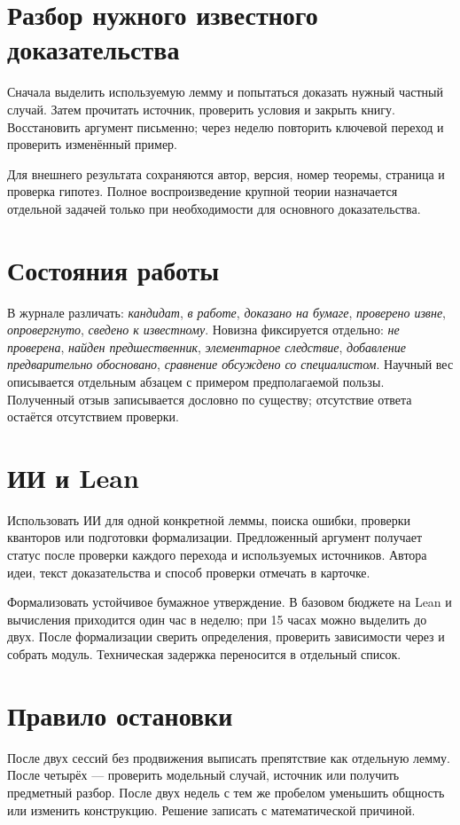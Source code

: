 \section{Разбор нужного известного доказательства}
Сначала выделить используемую лемму и попытаться доказать нужный частный
случай. Затем прочитать источник, проверить условия и закрыть книгу.
Восстановить аргумент письменно; через неделю повторить ключевой переход
и проверить изменённый пример.

Для внешнего результата сохраняются автор, версия, номер теоремы,
страница и проверка гипотез. Полное воспроизведение крупной теории
назначается отдельной задачей только при необходимости для основного
доказательства.

\section{Состояния работы}
В журнале различать: \emph{кандидат}, \emph{в работе},
\emph{доказано на бумаге}, \emph{проверено извне},
\emph{опровергнуто}, \emph{сведено к известному}.
Новизна фиксируется отдельно: \emph{не проверена},
\emph{найден предшественник}, \emph{элементарное следствие},
\emph{добавление предварительно обосновано},
\emph{сравнение обсуждено со специалистом}.
Научный вес описывается отдельным абзацем с примером предполагаемой пользы.
Полученный отзыв записывается дословно по существу;
отсутствие ответа остаётся отсутствием проверки.

\section{ИИ и Lean}
Использовать ИИ для одной конкретной леммы, поиска ошибки, проверки
кванторов или подготовки формализации. Предложенный аргумент получает
статус после проверки каждого перехода и используемых источников.
Автора идеи, текст доказательства и способ проверки отмечать в карточке.

Формализовать устойчивое бумажное утверждение. В базовом бюджете
на Lean и вычисления приходится один час в неделю; при 15 часах
можно выделить до двух. После формализации сверить определения,
проверить зависимости через  и собрать модуль.
Техническая задержка переносится в отдельный список.

\section{Правило остановки}
После двух сессий без продвижения выписать препятствие как отдельную
лемму. После четырёх --- проверить модельный случай, источник или получить
предметный разбор. После двух недель с тем же пробелом уменьшить общность
или изменить конструкцию. Решение записать с математической причиной.
